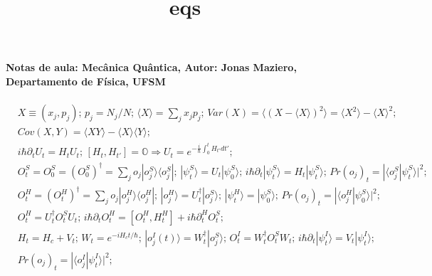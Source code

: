 \documentclass[11pt]{article}
\title{eqs}
\begin{document}
    
    
    \maketitle
    
    

    
    \paragraph{Notas de aula: Mecânica Quântica, Autor: Jonas Maziero,
Departamento de Física,
UFSM}\label{notas-de-aula-mecuxe2nica-quuxe2ntica-autor-jonas-maziero-departamento-de-fuxedsica-ufsm}

    \begin{align}
& X \equiv (x_{j},p_{j}) \text{; } p_{j} = N_{j}/N \text{; } \langle X\rangle=\sum_{j}x_{j}p_{j} \text{; } Var(X)= \langle(X-\langle X\rangle)^{2}\rangle=\langle X^{2}\rangle-\langle X\rangle^{2} \text{; } \\ 
& Cov(X,Y)=\langle XY\rangle - \langle X\rangle\langle Y\rangle \text{; } \\
& i\hbar\partial_{t}U_{t}=H_{t}U_{t} \text{; }[H_{t},H_{t'}]=\mathbb{O}\Rightarrow U_{t}=e^{-\frac{i}{\hbar}\int_{0}^{t}H_{t'}dt'} \text{; } \\
& O_{t}^{S}=O_{0}^{S}=(O_{0}^{S})^{\dagger}=\sum_{j}o_{j}|o_{j}^{S}\rangle\langle o_{j}^{S}| \text{;  } |\psi_{t}^{S}\rangle=U_{t}|\psi_{0}^{S}\rangle \text{; } i\hbar\partial_{t}|\psi_{t}^{S}\rangle = H_{t}|\psi_{t}^{S}\rangle \text{;  } Pr(o_{j})_{t}=|\langle o_{j}^{S}|\psi_{t}^{S}\rangle|^{2} \text{;  } \\
& O_{t}^{H} = (O_{t}^{H})^{\dagger}=\sum_{j}o_{j}|o_{j}^{H}\rangle\langle o_{j}^{H}| \text{; } |o_{j}^{H}\rangle = U_{t}^{\dagger}|o_{j}^{S}\rangle \text{; } |\psi_{t}^{H}\rangle=|\psi_{0}^{S}\rangle \text{;  } Pr(o_{j})_{t}=|\langle o_{j}^{H}|\psi_{0}^{S}\rangle|^{2} \text{; } \\
& O_{t}^{H} = U_{t}^{\dagger}O_{t}^{S}U_{t} \text{; } i\hbar\partial_{t}O_{t}^{H} = [O_{t}^{H},H_{t}^{H}] + i\hbar\partial_{t}^{H}O_{t}^{S} \text{; } \\
& H_{t}=H_{c}+V_{t} \text{; } W_{t} = e^{-iH_{c}t/\hbar} \text{; } |o_{j}^{I}(t)\rangle=W_{t}^{\dagger}|o_{j}^{S}\rangle \text{; } O_{t}^{I}=W_{t}^{\dagger}O_{t}^{S}W_{t} \text{; } i\hbar\partial_{t}|\psi_{t}^{I}\rangle = V_{t}|\psi_{t}^{I}\rangle \text{; } \\ 
& Pr(o_{j})_{t}=|\langle o_{j}^{I}|\psi_{t}^{I}\rangle|^{2} \text{; } \\

\end{align}
\end{document}
